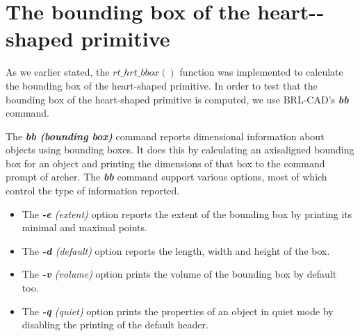 \clearpage



\section{The bounding box of the heart-­shaped primitive}

As   we   earlier   stated,   the   $rt\_hrt\_bbox()$   function   was   implemented   to
 calculate   the   bounding   box   of   the   heart-­shaped   primitive.   In   order   to   test   that  
the   bounding   box   of   the   heart-­shaped   primitive   is   computed,   we   use  
BRL­-CAD's \textit{\textbf{bb}} \cite{39} command.

\hspace{30} The   \textit{\textbf{bb (bounding box)}}  command   reports   dimensional   information   about   objects   using  
bounding   boxes.   It   does   this   by   calculating   an   axis­aligned   bounding   box   for   an  
object   and   printing   the   dimensions   of   that   box   to   the   command   prompt   of  
archer.   The   \textit{\textbf{bb}}   command   support   various   options,   most   of   which   control   the  
type of information reported.  

\begin{itemize}
\item The \textit{\textbf{-­e} (extent)} option reports the extent of the bounding box by printing its minimal and maximal points.  
\item The \textit{\textbf{-­d} (default)} option reports the length, width and height of the box.  
\item The \textit{\textbf{-­v} (volume)} option prints the volume of the bounding box by default too.  
\item The \textit{\textbf{-­q} (quiet)} option prints the properties of an object in quiet mode by disabling the printing of the default header.
\end{itemize}

